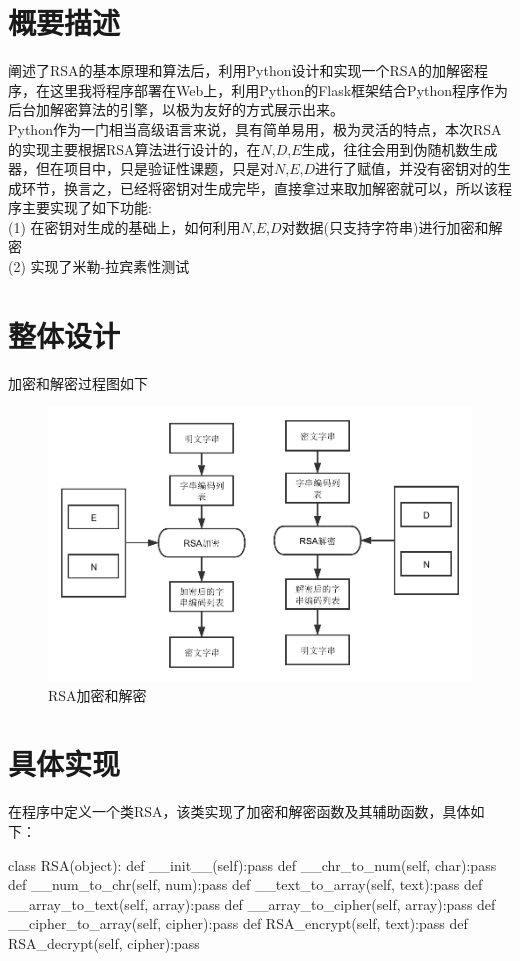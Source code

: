 \documentclass[UTF8,nofonts,cs4size]{ctexrep}
\begin{document}
\section{概要描述}
阐述了RSA的基本原理和算法后，利用Python设计和实现一个RSA的加解密程序，在这里我将程序部署在Web上，利用Python的Flask框架结合Python程序作为后台加解密算法的引擎，以极为友好的方式展示出来。\\
\indent Python作为一门相当高级语言来说，具有简单易用，极为灵活的特点，本次RSA的实现主要根据RSA算法进行设计的，在$N$,$D$,$E$生成，往往会用到伪随机数生成器，但在项目中，只是验证性课题，只是对$N$,$E$,$D$进行了赋值，并没有密钥对的生成环节，换言之，已经将密钥对生成完毕，直接拿过来取加解密就可以，所以该程序主要实现了如下功能:\\
\indent (1) 在密钥对生成的基础上，如何利用$N$,$E$,$D$对数据(只支持字符串)进行加密和解密\\
\indent (2) 实现了米勒-拉宾素性测试

\section{整体设计}

加密和解密过程图如下
\begin{figure}{}
\centering
\includegraphics[scale=0.8]{encrypt-and-decrypt.pdf}
\caption{RSA加密和解密}
\end{figure}
\section{具体实现}
在程序中定义一个类RSA，该类实现了加密和解密函数及其辅助函数，具体如下：


\begin{python}
class RSA(object):
    def __init__(self):pass       
    def __chr_to_num(self, char):pass        
    def __num_to_chr(self, num):pass        
    def __text_to_array(self, text):pass        
    def __array_to_text(self, array):pass      
    def __array_to_cipher(self, array):pass     
    def __cipher_to_array(self, cipher):pass       
    def RSA_encrypt(self, text):pass    
    def RSA_decrypt(self, cipher):pass
  
\end{python}
\end{document}
